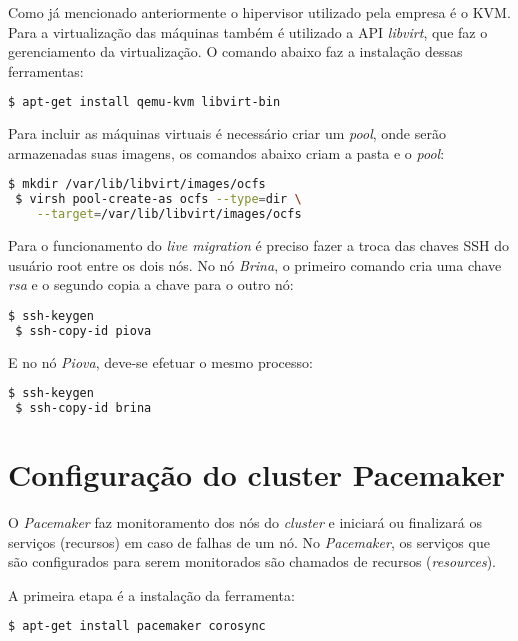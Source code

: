 Como já mencionado anteriormente o hipervisor utilizado pela empresa é o \ac{KVM}. Para a virtualização das máquinas também é utilizado a 
\ac{API} \textit{libvirt}, que faz o gerenciamento da virtualização. O comando abaixo faz a instalação dessas ferramentas:
\begin{lstlisting}[language=bash]
 $ apt-get install qemu-kvm libvirt-bin
\end{lstlisting}

Para incluir as máquinas virtuais é necessário criar um \textit{pool}, onde serão armazenadas suas imagens, os comandos abaixo criam a pasta
e o \textit{pool}:
\begin{lstlisting}[language=bash]
 $ mkdir /var/lib/libvirt/images/ocfs
 $ virsh pool-create-as ocfs --type=dir \
    --target=/var/lib/libvirt/images/ocfs
\end{lstlisting}

Para o funcionamento do \textit{live migration} é preciso fazer a troca das chaves \ac{SSH} do usuário root entre os dois nós.
No nó \textit{Brina}, o primeiro comando cria uma chave \textit{rsa} e o segundo copia a chave para o outro nó:
\begin{lstlisting}[language=bash]
 $ ssh-keygen
 $ ssh-copy-id piova
\end{lstlisting}

E no nó \textit{Piova}, deve-se efetuar o mesmo processo:
\begin{lstlisting}[language=bash]
 $ ssh-keygen
 $ ssh-copy-id brina
\end{lstlisting}

\section{Configuração do cluster Pacemaker}
\label{ap:confpacemaker}

O \textit{Pacemaker} faz monitoramento dos nós do \textit{cluster} e iniciará ou finalizará os serviços (recursos) em caso de falhas de um nó.
No \textit{Pacemaker}, os serviços que são configurados para serem monitorados são chamados de recursos (\textit{resources}).

A primeira etapa é a instalação da ferramenta:
\begin{lstlisting}[language=bash]
 $ apt-get install pacemaker corosync
\end{lstlisting}

